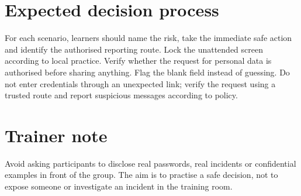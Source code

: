 \documentclass[11pt,openany,oneside]{book}
\begin{document}
\section{Expected decision process}
For each scenario, learners should name the risk, take the immediate safe action and identify the authorised reporting route. Lock the unattended screen according to local practice. Verify whether the request for personal data is authorised before sharing anything. Flag the blank field instead of guessing. Do not enter credentials through an unexpected link; verify the request using a trusted route and report suspicious messages according to policy.
\section{Trainer note}
Avoid asking participants to disclose real passwords, real incidents or confidential examples in front of the group. The aim is to practise a safe decision, not to expose someone or investigate an incident in the training room.

\backmatter
\end{document}
